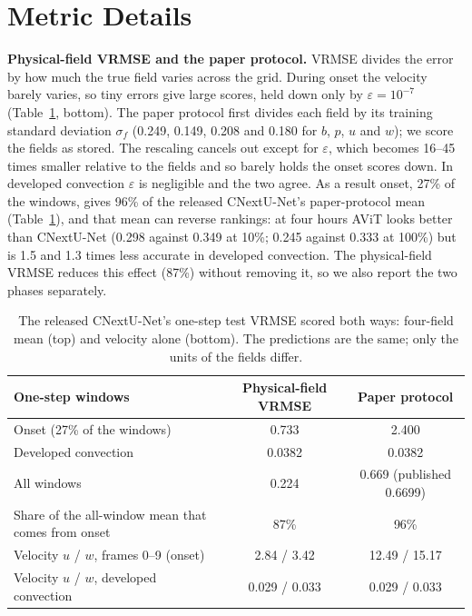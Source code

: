 \documentclass[11pt]{article}
\begin{document}
\section{Metric Details}
\label{app:metrics}

\textbf{Physical-field VRMSE and the paper protocol.} VRMSE divides the error by how much the true field varies
across the grid. During onset the velocity barely varies, so tiny errors give large scores, held down only by
$\varepsilon=10^{-7}$ (Table~\ref{tab:units}, bottom). The paper protocol first divides each field by its training
standard deviation $\sigma_f$ (0.249, 0.149, 0.208 and 0.180 for $b$, $p$, $u$ and $w$); we score the fields as
stored. The rescaling cancels out except for $\varepsilon$, which becomes 16--45 times smaller relative to the
fields and so barely holds the onset scores down. In developed convection $\varepsilon$ is negligible and the two
agree. As a result onset, 27\% of the windows, gives 96\% of the released CNextU-Net's paper-protocol mean
(Table~\ref{tab:units}), and that mean can reverse rankings: at four hours AViT looks better than CNextU-Net (0.298
against 0.349 at 10\%; 0.245 against 0.333 at 100\%) but is 1.5 and 1.3 times less accurate in developed convection.
The physical-field VRMSE reduces this effect (87\%) without removing it, so we also report the two phases separately.

\begin{table}[!htbp]
\centering\small
\begin{tabular}{@{}lcc@{}}
\toprule
One-step windows & Physical-field VRMSE & Paper protocol \\
\midrule
Onset (27\% of the windows) & 0.733 & 2.400 \\
Developed convection & 0.0382 & 0.0382 \\
All windows & 0.224 & 0.669 (published 0.6699) \\
\midrule
Share of the all-window mean that comes from onset & 87\% & 96\% \\
\midrule
Velocity $u$ / $w$, frames 0--9 (onset) & 2.84 / 3.42 & 12.49 / 15.17 \\
Velocity $u$ / $w$, developed convection & 0.029 / 0.033 & 0.029 / 0.033 \\
\bottomrule
\end{tabular}
\caption{The released CNextU-Net's one-step test VRMSE scored both ways: four-field mean (top) and velocity alone
(bottom). The predictions are the same; only the units of the fields differ.}
\label{tab:units}
\end{table}
\end{document}
